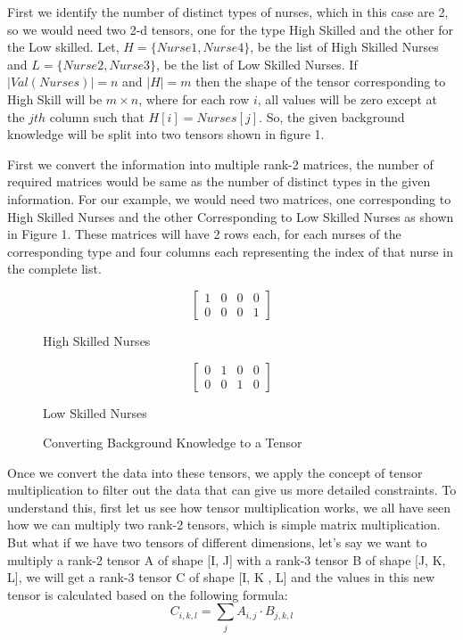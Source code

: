 \documentclass{article}
\begin{document}
First we identify the number of distinct types of nurses, which in this case are 2, so we would need two 2-d tensors, one for the type High Skilled and the other for the Low skilled. Let, $H = \{Nurse1, Nurse4\}$, be the list of High Skilled Nurses and $L = \{Nurse2, Nurse3\}$, be the list of Low Skilled Nurses. If $|Val(Nurses)|=n$ and $|H|=m$ then the shape of the tensor corresponding to High Skill will be $m \times n$, where for each row $i$, all values will be zero except at the $jth$ column such that $H[i]=Nurses[j]$. So, the given background knowledge will be split into two tensors shown in figure 1.

First we convert the information into multiple rank-2 matrices, the number of required matrices would be same as the number of distinct types in the given information. For our example, we would need two matrices, one corresponding to High Skilled Nurses and the other Corresponding to Low Skilled Nurses as shown in Figure 1. These matrices will have 2 rows each, for each nurses of the corresponding type and four columns each representing the index of that nurse in the complete list.
\begin{figure}[!htbp]
\begin{minipage}{.5\linewidth}
\[
\begin{bmatrix}
    1 & 0 & 0 & 0  \\
    0 & 0 & 0 & 1  
\end{bmatrix}
\]
\begin{center}
High Skilled Nurses
\end{center}
\end{minipage}%
\begin{minipage}{.5\linewidth}
\[
\begin{bmatrix}
    0 & 1 & 0 & 0  \\
    0 & 0 & 1 & 0  
\end{bmatrix}
\]
\begin{center}
Low Skilled Nurses
\end{center}
\end{minipage}
\caption{Converting Background Knowledge to a Tensor}
\end{figure}
Once we convert the data into these tensors, we apply the concept of tensor multiplication to filter out the data that can give us more detailed constraints. To understand this, first let us see how tensor multiplication works, we all have seen how we can multiply two rank-2 tensors, which is simple matrix multiplication. But what if we have two tensors of different dimensions, let's say we want to multiply a rank-2 tensor A of shape [I, J] with a rank-3 tensor B of shape [J, K, L], we will get a rank-3 tensor C of shape [I, K , L] and the values in this new tensor is calculated based on the following formula:
\[
C_{i,k,l} = \sum_{j}A_{i,j} \cdot B_{j,k,l}
\]
\end{document}
